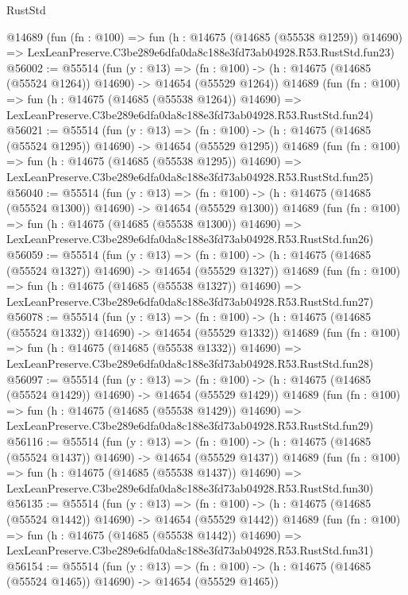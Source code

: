 \begin{lexlean}{RustStd}
\begin{coremodule}
    @14689
    (fun (fn : @100) =>
    fun (h : @14675 (@14685 (@55538 @1259)) @14690) =>
    LexLeanPreserve.C3be289e6dfa0da8c188e3fd73ab04928.R53.RustStd.fun23)
@56002 := @55514
    (fun (y : @13) =>
    (fn : @100) -> (h : @14675 (@14685 (@55524 @1264)) @14690) -> @14654 (@55529 @1264))
    @14689
    (fun (fn : @100) =>
    fun (h : @14675 (@14685 (@55538 @1264)) @14690) =>
    LexLeanPreserve.C3be289e6dfa0da8c188e3fd73ab04928.R53.RustStd.fun24)
@56021 := @55514
    (fun (y : @13) =>
    (fn : @100) -> (h : @14675 (@14685 (@55524 @1295)) @14690) -> @14654 (@55529 @1295))
    @14689
    (fun (fn : @100) =>
    fun (h : @14675 (@14685 (@55538 @1295)) @14690) =>
    LexLeanPreserve.C3be289e6dfa0da8c188e3fd73ab04928.R53.RustStd.fun25)
@56040 := @55514
    (fun (y : @13) =>
    (fn : @100) -> (h : @14675 (@14685 (@55524 @1300)) @14690) -> @14654 (@55529 @1300))
    @14689
    (fun (fn : @100) =>
    fun (h : @14675 (@14685 (@55538 @1300)) @14690) =>
    LexLeanPreserve.C3be289e6dfa0da8c188e3fd73ab04928.R53.RustStd.fun26)
@56059 := @55514
    (fun (y : @13) =>
    (fn : @100) -> (h : @14675 (@14685 (@55524 @1327)) @14690) -> @14654 (@55529 @1327))
    @14689
    (fun (fn : @100) =>
    fun (h : @14675 (@14685 (@55538 @1327)) @14690) =>
    LexLeanPreserve.C3be289e6dfa0da8c188e3fd73ab04928.R53.RustStd.fun27)
@56078 := @55514
    (fun (y : @13) =>
    (fn : @100) -> (h : @14675 (@14685 (@55524 @1332)) @14690) -> @14654 (@55529 @1332))
    @14689
    (fun (fn : @100) =>
    fun (h : @14675 (@14685 (@55538 @1332)) @14690) =>
    LexLeanPreserve.C3be289e6dfa0da8c188e3fd73ab04928.R53.RustStd.fun28)
@56097 := @55514
    (fun (y : @13) =>
    (fn : @100) -> (h : @14675 (@14685 (@55524 @1429)) @14690) -> @14654 (@55529 @1429))
    @14689
    (fun (fn : @100) =>
    fun (h : @14675 (@14685 (@55538 @1429)) @14690) =>
    LexLeanPreserve.C3be289e6dfa0da8c188e3fd73ab04928.R53.RustStd.fun29)
@56116 := @55514
    (fun (y : @13) =>
    (fn : @100) -> (h : @14675 (@14685 (@55524 @1437)) @14690) -> @14654 (@55529 @1437))
    @14689
    (fun (fn : @100) =>
    fun (h : @14675 (@14685 (@55538 @1437)) @14690) =>
    LexLeanPreserve.C3be289e6dfa0da8c188e3fd73ab04928.R53.RustStd.fun30)
@56135 := @55514
    (fun (y : @13) =>
    (fn : @100) -> (h : @14675 (@14685 (@55524 @1442)) @14690) -> @14654 (@55529 @1442))
    @14689
    (fun (fn : @100) =>
    fun (h : @14675 (@14685 (@55538 @1442)) @14690) =>
    LexLeanPreserve.C3be289e6dfa0da8c188e3fd73ab04928.R53.RustStd.fun31)
@56154 := @55514
    (fun (y : @13) =>
    (fn : @100) -> (h : @14675 (@14685 (@55524 @1465)) @14690) -> @14654 (@55529 @1465))

\end{coremodule}
\end{lexlean}
